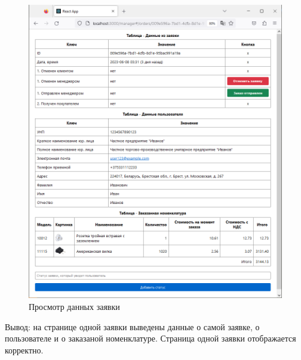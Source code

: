 \begin{figure}[!htb]\centering

    \includegraphics[width=14cm]
    {images/mobile/manager/tests/order_view.png}

    \caption{Просмотр данных заявки}
    \label{fig:test_manager_order_view}
\end{figure}

Вывод: на странице одной заявки выведены данные о самой заявке, о пользователе и о заказаной номенклатуре.
Страница одной заявки отображается корректно.

